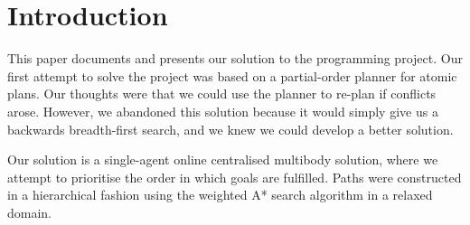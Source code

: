\section{Introduction}
\label{sec:introduction}


This paper documents and presents our solution to the programming project.
Our first attempt to solve the project was based on a partial-order planner for atomic plans.
Our thoughts were that we could use the planner to re-plan if conflicts arose.
However, we abandoned this solution because it would simply give us a backwards breadth-first search, and we knew we could develop a better solution.

Our solution is a single-agent online centralised multibody solution, where we attempt to prioritise the order in which goals are fulfilled.
Paths were constructed in a hierarchical fashion using the weighted A* search algorithm in a relaxed domain.



